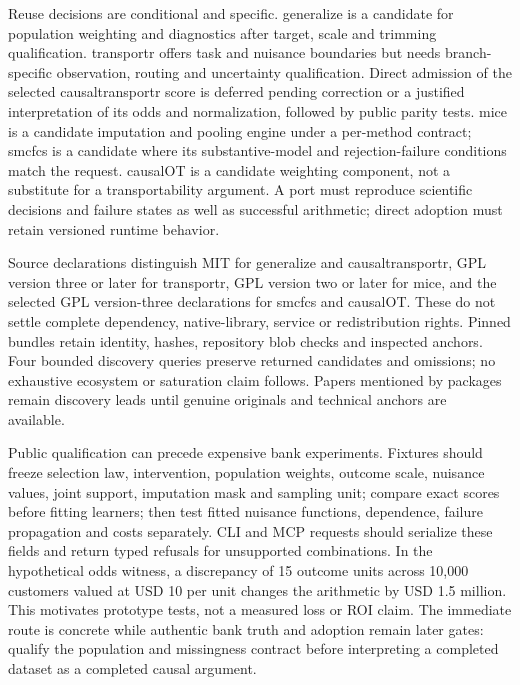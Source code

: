 Reuse decisions are conditional and specific. generalize is a candidate for population weighting and diagnostics after target, scale and trimming qualification. transportr offers task and nuisance boundaries but needs branch-specific observation, routing and uncertainty qualification. Direct admission of the selected causaltransportr score is deferred pending correction or a justified interpretation of its odds and normalization, followed by public parity tests. mice is a candidate imputation and pooling engine under a per-method contract; smcfcs is a candidate where its substantive-model and rejection-failure conditions match the request. causalOT is a candidate weighting component, not a substitute for a transportability argument. A port must reproduce scientific decisions and failure states as well as successful arithmetic; direct adoption must retain versioned runtime behavior.~\citep{exec25_rtm_choice}

Source declarations distinguish MIT for generalize and causaltransportr, GPL version three or later for transportr, GPL version two or later for mice, and the selected GPL version-three declarations for smcfcs and causalOT. These do not settle complete dependency, native-library, service or redistribution rights. Pinned bundles retain identity, hashes, repository blob checks and inspected anchors. Four bounded discovery queries preserve returned candidates and omissions; no exhaustive ecosystem or saturation claim follows. Papers mentioned by packages remain discovery leads until genuine originals and technical anchors are available.~\citep{exec25_rtm_generalize,exec25_rtm_transportr,exec25_rtm_causaltransportr,exec25_rtm_mice,exec25_rtm_smcfcs,exec25_rtm_causalOT,exec25_rtm_choice}

Public qualification can precede expensive bank experiments. Fixtures should freeze selection law, intervention, population weights, outcome scale, nuisance values, joint support, imputation mask and sampling unit; compare exact scores before fitting learners; then test fitted nuisance functions, dependence, failure propagation and costs separately. CLI and MCP requests should serialize these fields and return typed refusals for unsupported combinations. In the hypothetical odds witness, a discrepancy of 15 outcome units across 10,000 customers valued at USD 10 per unit changes the arithmetic by USD 1.5 million. This motivates prototype tests, not a measured loss or ROI claim. The immediate route is concrete while authentic bank truth and adoption remain later gates: qualify the population and missingness contract before interpreting a completed dataset as a completed causal argument.~\citep{exec25_rtm_choice}


